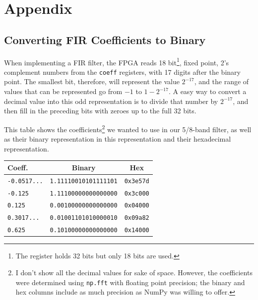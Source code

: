 \documentclass[12pt]{article}
\begin{document}
\section{Appendix}
\subsection{Converting FIR Coefficients to Binary}
When implementing a FIR filter, the FPGA reads 18 bit\footnote{The register holds 32 bits but only 18 bits are used.}, fixed point, 2's complement numbers from the \texttt{coeff} registers, with 17 digits after the binary point. The smallest bit, therefore, will represent the value $2^{-17}$, and the range of values that can be represented go from $-1$ to $1-2^{-17}$. A easy way to convert a decimal value into this odd representation is to divide that number by $2^{-17}$, and then fill in the preceding bits with zeroes up to the full 32 bits.

This table shows the coefficients\footnote{I don't show all the decimal values for sake of space. However, the coefficients were determined using \texttt{np.fft} with floating point precision; the binary and hex columns include as much precision as NumPy was willing to offer.} we wanted to use in our 5/8-band filter, as well as their binary representation in this representation and their hexadecimal representation.

\begin{center}
  \begin{tabular}{ l | c | c }
    Coeff. & Binary & Hex\\ \hline
    \texttt{-0.0517...}  &  \texttt{1.11110010101111101} & \texttt{0x3e57d}\\
    \texttt{-0.125} &  \texttt{1.11100000000000000} & \texttt{0x3c000}\\
    \texttt{0.125} & \texttt{0.00100000000000000} & \texttt{0x04000}\\
    \texttt{0.3017...} &  \texttt{0.01001101010000010} & \texttt{0x09a82}\\
    \texttt{0.625} &  \texttt{0.10100000000000000} & \texttt{0x14000}\\
   \end{tabular}
\end{center}
\end{document}
